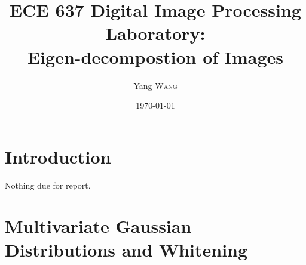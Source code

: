 \documentclass{article}
\title{ECE 637 Digital Image Processing Laboratory: \\ Eigen-decompostion of
Images} %
\author{Yang \textsc{Wang}} %
\date{\today} %
\begin{document}
\maketitle %


\section{Introduction}
	Nothing due for report.

\section{Multivariate Gaussian Distributions and Whitening}
\end{document}
